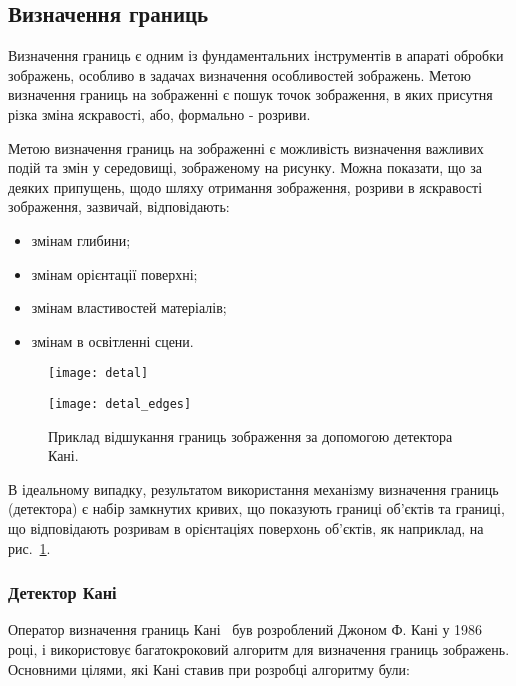 \subsection{Визначення границь}

Визначення границь є одним із фундаментальних інструментів в апараті обробки зображень, особливо в задачах визначення особливостей зображень. Метою визначення границь на зображенні є пошук точок зображення, в яких присутня різка зміна яскравості, або, формально - розриви.

Метою визначення границь на зображенні є можливість визначення важливих подій та змін у середовищі, зображеному на рисунку. Можна показати, що за деяких припущень, щодо шляху отримання зображення, розриви в яскравості зображення, зазвичай, відповідають:

\begin{itemize}
  \item змінам глибини;
  \item змінам орієнтації поверхні;
  \item змінам властивостей матеріалів;
  \item змінам в освітленні сцени.
\end{itemize}

\begin{figure}[h]
  \begin{minipage}[h]{0.49\linewidth}
    \texttt{[image: detal]}
  \end{minipage}
  \hfill
  \begin{minipage}[h]{0.49\linewidth}
    \texttt{[image: detal\_edges]}
  \end{minipage}
  \caption{Приклад відшукання границь зображення за допомогою детектора Кані.}
  \label{fig:canny_edges}
\end{figure}

В ідеальному випадку, результатом використання механізму визначення границь (детектора) є набір замкнутих кривих, що показують границі об'єктів та границі, що відповідають розривам в орієнтаціях поверхонь об'єктів, як наприклад, на рис.~\ref{fig:canny_edges}. 

\subsubsection{Детектор Кані}

Оператор визначення границь Кані~\cite{Canny:1986:CAE:11274.11275} був розроблений Джоном Ф. Кані у 1986 році, і використовує багатокроковий алгоритм для визначення границь зображень. Основними цілями, які Кані ставив при розробці алгоритму були:

